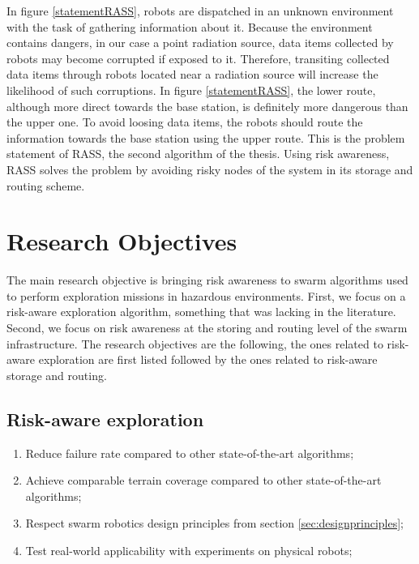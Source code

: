 In figure \ref{statementRASS}, robots are dispatched in an unknown environment with the task of gathering information about it. Because the environment contains dangers, in our case a point radiation source, data items collected by robots may become corrupted if exposed to it. Therefore, transiting collected data items through robots located near a radiation source will increase the likelihood of such corruptions. In figure \ref{statementRASS}, the lower route, although more direct towards the base station, is definitely more dangerous than the upper one. To avoid loosing data items, the robots should route the information towards the base station using the upper route. This is the problem statement of RASS, the second algorithm of the thesis. Using risk awareness, RASS solves the problem by avoiding risky nodes of the system in its storage and routing scheme.



\section{Research Objectives} 
\label{sec:objectifs}


The main research objective is bringing risk awareness to swarm algorithms used to perform exploration missions in hazardous environments. First, we focus on a risk-aware exploration algorithm, something that was lacking in the literature. Second, we focus on risk awareness at the storing and routing level of the swarm infrastructure. The research objectives are the following, the ones related to risk-aware exploration are first listed followed by the ones related to risk-aware storage and routing.


\subsection{Risk-aware exploration}
\begin{enumerate}
    \item Reduce failure rate compared to other state-of-the-art algorithms;
    \item Achieve comparable terrain coverage compared to other state-of-the-art algorithms;
    \item Respect swarm robotics design principles from section \ref{sec:designprinciples};
    \item Test real-world applicability with experiments on physical robots;
\end{enumerate}

